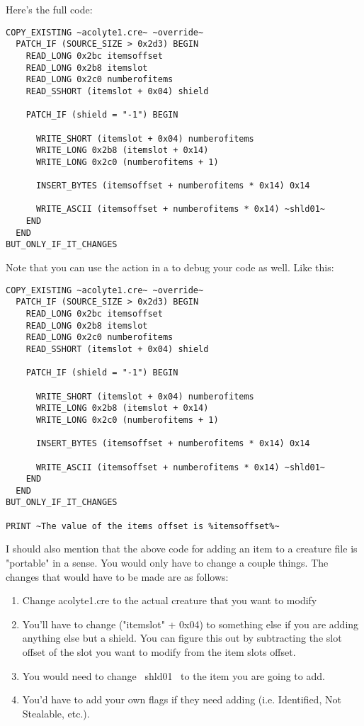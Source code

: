 \documentclass{article}
\def\ttref#1{\ahrefloc{#1}{\tt #1}}
\begin{document}
Here's the full code:

\begin{verbatim}
COPY_EXISTING ~acolyte1.cre~ ~override~
  PATCH_IF (SOURCE_SIZE > 0x2d3) BEGIN
    READ_LONG 0x2bc itemsoffset
    READ_LONG 0x2b8 itemslot
    READ_LONG 0x2c0 numberofitems
    READ_SSHORT (itemslot + 0x04) shield

    PATCH_IF (shield = "-1") BEGIN

      WRITE_SHORT (itemslot + 0x04) numberofitems
      WRITE_LONG 0x2b8 (itemslot + 0x14)
      WRITE_LONG 0x2c0 (numberofitems + 1)

      INSERT_BYTES (itemsoffset + numberofitems * 0x14) 0x14

      WRITE_ASCII (itemsoffset + numberofitems * 0x14) ~shld01~
    END
  END
BUT_ONLY_IF_IT_CHANGES
\end{verbatim}

Note that you can use the \ttref{PRINT} action in a \ttref{tp2} to debug
your code as well.  Like this:

\begin{verbatim}
COPY_EXISTING ~acolyte1.cre~ ~override~
  PATCH_IF (SOURCE_SIZE > 0x2d3) BEGIN
    READ_LONG 0x2bc itemsoffset
    READ_LONG 0x2b8 itemslot
    READ_LONG 0x2c0 numberofitems
    READ_SSHORT (itemslot + 0x04) shield

    PATCH_IF (shield = "-1") BEGIN

      WRITE_SHORT (itemslot + 0x04) numberofitems
      WRITE_LONG 0x2b8 (itemslot + 0x14)
      WRITE_LONG 0x2c0 (numberofitems + 1)

      INSERT_BYTES (itemsoffset + numberofitems * 0x14) 0x14

      WRITE_ASCII (itemsoffset + numberofitems * 0x14) ~shld01~
    END
  END
BUT_ONLY_IF_IT_CHANGES

PRINT ~The value of the items offset is %itemsoffset%~
\end{verbatim}

I should also mention that the above code for adding an item to a creature
file is "portable" in a sense.  You would only have to change a couple
things.  The changes that would have to be made are as follows:

\begin{enumerate}
\item Change acolyte1.cre to the actual creature that you want to modify
\item You'll have to change ("itemslot" + 0x04) to something else if you
are adding anything else but a shield.  You can figure this out by
subtracting the slot offset of the slot you want to modify from the item
slots offset.
\item You would need to change ~shld01~ to the item you are going to add.
\item You'd have to add your own flags if they need adding  (i.e.
Identified, Not Stealable, etc.).
\end{enumerate}
\end{document}
